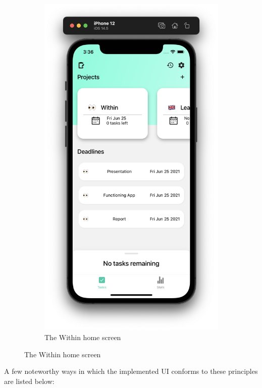 \begin{figure}[h]
\begin{subfigure}{0.4\linewidth}
        \centering
        \includegraphics[scale=0.25]{images/home_screen.png}
        \caption{The Within home screen}
        \label{fig:home_screen}
    \end{subfigure}%
\end{figure}

A few noteworthy ways in which the implemented UI conforms to these principles are listed below:

